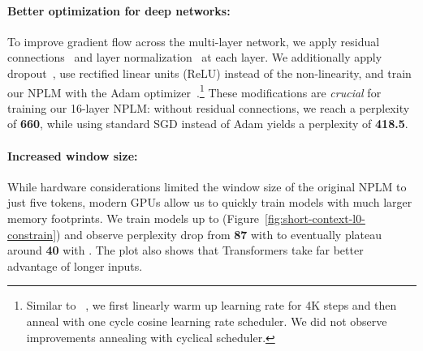 \documentclass[11pt]{article}
\begin{document}
\paragraph{Better optimization for deep networks:} To improve gradient flow across the multi-layer network, we apply residual connections~\citep{he2016deep} and layer normalization~\citep{ba2016layer} at each layer. We additionally apply dropout~\citep{JMLR:v15:srivastava14a}, use rectified linear units (ReLU) instead of the  non-linearity, and train our NPLM with the Adam optimizer~\citep{kingma2015adam}.\footnote{Similar to ~\citet{baevski2018adaptive}, we first linearly warm up learning rate for 4K steps and then anneal with one cycle cosine learning rate scheduler. We did not observe improvements annealing with cyclical scheduler.} These modifications are \emph{crucial} for training our 16-layer NPLM: without residual connections, we reach a perplexity of \textbf{660}, while using standard SGD instead of Adam yields a perplexity of \textbf{418.5}.

\paragraph{Increased window size:} While hardware considerations limited the window size  of the original NPLM to just five tokens, modern GPUs allow us to quickly train models with much larger memory footprints. We train models up to  (Figure~\ref{fig:short-context-l0-constrain}) and observe perplexity drop from \textbf{87} with  to eventually plateau around \textbf{40} with . The plot also shows that Transformers take far better advantage of longer inputs.
\end{document}
